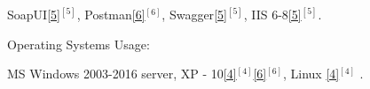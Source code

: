 \begin{cventries}
{\begin{cvitems}
{        \textcolor{rainbowcolor-olive}{SoapUI\ref{5}{$^{[5]}$}},
        \textcolor{rainbowcolor-olive}{Postman\ref{6}{$^{[6]}$}},
        \textcolor{rainbowcolor-olive}{Swagger\ref{5}{$^{[5]}$}},    
        \textcolor{rainbowcolor-olive}{IIS 6-8\ref{5}{$^{[5]}$}}.%
		}
      \end{cvitems}
    }  
    
%    
%    
  \cventry
    {Operating Systems Usage:} %
    {} 
    {} 
    {} 
    {
      \vspace{0.1cm}
      \begin{cvitems} %
        \item[] {
        \textcolor{rainbowcolor-orange}{MS Windows 2003-2016 server, XP - 10\ref{4}{$^{[4]}$}\ref{6}{$^{[6]}$}}, 
        \textcolor{rainbowcolor-orange}{Linux%
\ref{4}{$^{[4]}$}}%
        .} 
      \end{cvitems}
    }  
  \vspace{-0.6cm} 
    


\end{cventries}
